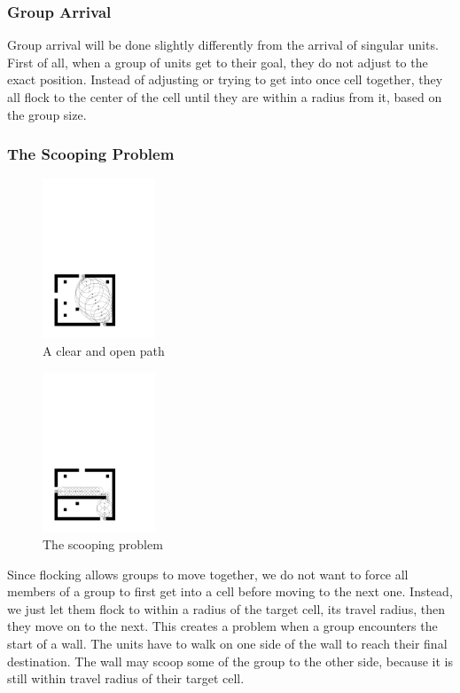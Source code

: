 \subsubsection{Group Arrival}
Group arrival will be done slightly differently from the arrival of singular units. First of all, when a group of units get to their goal, they do not adjust to the exact position. Instead of adjusting or trying to get into once cell together, they all flock to the center of the cell until they are within a radius from it, based on the group size. 

\subsubsection{The Scooping Problem}
\begin{figure}
\includegraphics[width=0.30\textwidth]{images/clear_path1.pdf}
\caption{A clear and open path}
\label{fig:clear_path}
\end{figure} 
\begin{figure}
\includegraphics[width=0.30\textwidth]{images/scoop_path1.pdf}
\caption{The scooping problem}
\label{fig:scoop_path}
\end{figure} 
Since flocking allows groups to move together, we do not want to force all members of a group to first get into a cell before moving to the next one. Instead, we just let them flock to within a radius of the target cell, its travel radius, then they move on to the next. This creates a problem when a group encounters the start of a wall. The units have to walk on one side of the wall to reach their final destination. The wall may scoop some of the group to the other side, because it is still within travel radius of their target cell.

